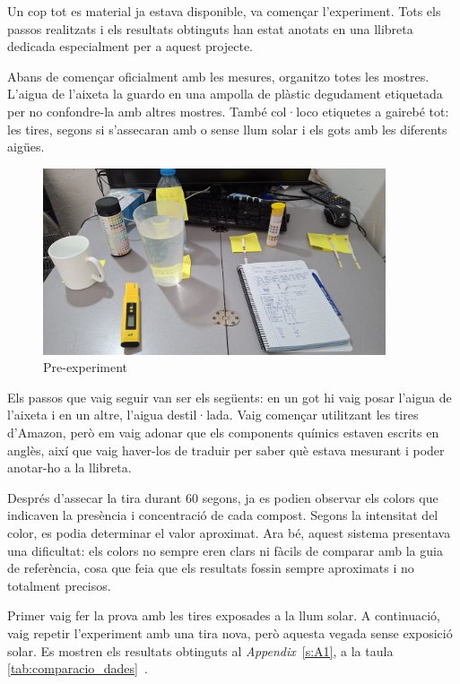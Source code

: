 
Un cop tot es material ja estava disponible, va començar l'experiment. Tots els passos realitzats i els resultats obtinguts han estat anotats en una llibreta dedicada especialment per a aquest projecte.

Abans de començar oficialment amb les mesures, organitzo totes les mostres. L’aigua de l’aixeta la guardo en una ampolla de plàstic degudament etiquetada per no confondre-la amb altres mostres. També col·loco etiquetes a gairebé tot: les tires, segons si s’assecaran amb o sense llum solar i els gots amb les diferents aigües.

\begin{figure}[h]
\centering
\includegraphics[width=0.9\textwidth, angle=0]{./Figures/expe.png}
\caption{Pre-experiment }
\label{fig:fotoPreExperiment}
\end{figure}

Els passos que vaig seguir van ser els següents: en un got hi vaig posar l’aigua de l’aixeta i en un altre, l’aigua destil·lada. Vaig començar utilitzant les tires d’Amazon, però em vaig adonar que els components químics estaven escrits en anglès, així que vaig haver-los de traduir per saber què estava mesurant i poder anotar-ho a la llibreta.

Després d’assecar la tira durant 60 segons, ja es podien observar els colors que indicaven la presència i concentració de cada compost. Segons la intensitat del color, es podia determinar el valor aproximat. Ara bé, aquest sistema presentava una dificultat: els colors no sempre eren clars ni fàcils de comparar amb la guia de referència, cosa que feia que els resultats fossin sempre aproximats i no totalment precisos.

Primer vaig fer la prova amb les tires exposades a la llum solar. A continuació, vaig repetir l’experiment amb una tira nova, però aquesta vegada sense exposició solar. Es mostren els resultats obtinguts al \textit{Appendix}~\ref{s:A1}, a la taula \ref{tab:comparacio_dades}~.



